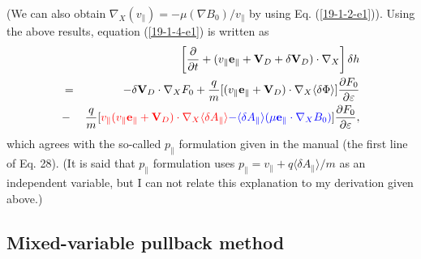 \documentclass{llncs}
\newcommand{\tmcolor}[2]{{\color{#1}{#2}}}
\newcommand{\tmtexttt}[1]{\text{{\ttfamily{#1}}}}
\begin{document}
(We can also obtain $\nabla_X (v_{\parallel}) = - \mu (\nabla B_0) /
v_{\parallel}$ by using Eq. (\ref{19-1-2-e1})). Using the above results,
equation (\ref{19-1-4-e1}) is written as
\begin{eqnarray}
  &  & \left[ \frac{\partial}{\partial t} + (v_{\parallel}
  \mathbf{e}_{\parallel} +\mathbf{V}_D + \delta \mathbf{V}_D) \cdot \nabla_X
  \right] \delta h \nonumber\\
  & = & - \delta \mathbf{V}_D \cdot \nabla_X F_0 + \frac{q}{m}
  [(v_{\parallel} \mathbf{e}_{\parallel} +\mathbf{V}_D) \cdot \nabla_X \langle
  \delta \Phi \rangle] \frac{\partial F_0}{\partial \varepsilon} \nonumber\\
  & - & \frac{q}{m} [\tmcolor{red}{v_{\parallel} (v_{\parallel}
  \mathbf{e}_{\parallel} +\mathbf{V}_D) \cdot \nabla_X \langle \delta
  A_{\parallel} \rangle} \tmcolor{blue}{} \tmcolor{blue}{- \langle \delta
  A_{\parallel} \rangle (\mu \mathbf{e}_{\parallel} \cdot \nabla_X B_0)}]
  \frac{\partial F_0}{\partial \varepsilon},  \label{19-1-4-5}
\end{eqnarray}
which agrees with the so-called $p_{\parallel}$ formulation given in the
\tmtexttt{GEM} manual (the first line of Eq. 28). (It is said that
$p_{\parallel}$ formulation uses $p_{\parallel} = v_{\parallel} + q \langle
\delta A_{\parallel} \rangle / m$ as an independent variable, but I can not
relate this explanation to my derivation given above.)

\subsection{Mixed-variable pullback method{\cite{MISHCHENKO2019194}}}
\end{document}
